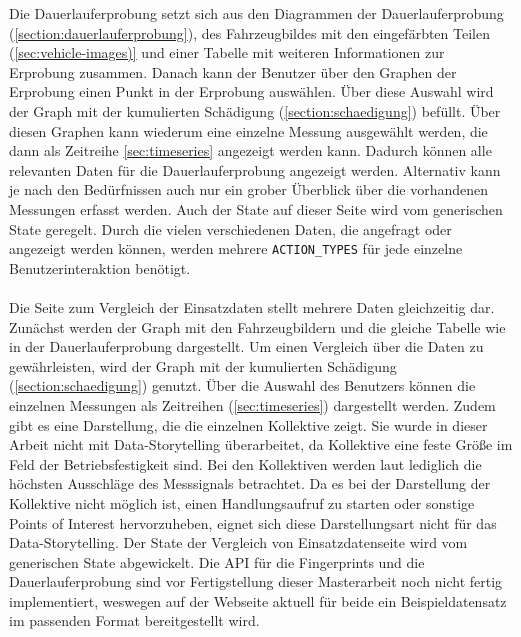Die Dauerlauferprobung setzt sich aus den Diagrammen der Dauerlauferprobung (\ref{section:dauerlauferprobung}), des Fahrzeugbildes mit den eingefärbten Teilen (\ref{sec:vehicle-images)} und einer Tabelle mit weiteren Informationen zur Erprobung zusammen. Danach kann der Benutzer über den Graphen der Erprobung einen Punkt in der Erprobung auswählen. Über diese Auswahl wird der Graph mit der kumulierten Schädigung (\ref{section:schaedigung}) befüllt. Über diesen Graphen kann wiederum eine einzelne Messung ausgewählt werden, die dann als Zeitreihe \ref{sec:timeseries} angezeigt werden kann. Dadurch können alle relevanten Daten für die Dauerlauferprobung angezeigt werden. Alternativ kann je nach den Bedürfnissen auch nur ein grober Überblick über die vorhandenen Messungen erfasst werden. Auch der State auf dieser Seite wird vom generischen State geregelt. Durch die vielen verschiedenen Daten, die angefragt oder angezeigt werden können, werden mehrere \texttt{ACTION\_TYPES} für jede einzelne Benutzerinteraktion benötigt.\\\\
Die Seite zum Vergleich der Einsatzdaten stellt mehrere Daten gleichzeitig dar. Zunächst werden der Graph mit den Fahrzeugbildern und die gleiche Tabelle wie in der Dauerlauferprobung dargestellt. Um einen Vergleich über die Daten zu gewährleisten, wird der Graph mit der kumulierten Schädigung (\ref{section:schaedigung}) genutzt. Über die Auswahl des Benutzers können die einzelnen Messungen als Zeitreihen (\ref{sec:timeseries}) dargestellt werden. Zudem gibt es eine Darstellung, die die einzelnen Kollektive zeigt. Sie wurde in dieser Arbeit nicht mit Data-Storytelling überarbeitet, da Kollektive eine feste Größe im Feld der Betriebsfestigkeit \cite{Gotz.2020} sind. Bei den Kollektiven werden laut \cite{PatrickPfeiffer.17.10.2022} lediglich die höchsten Ausschläge des Messsignals betrachtet. Da es bei der Darstellung der Kollektive nicht möglich ist, einen Handlungsaufruf zu starten oder sonstige Points of Interest hervorzuheben, eignet sich diese Darstellungsart nicht für das Data-Storytelling. Der State der Vergleich von Einsatzdatenseite wird vom generischen State abgewickelt. Die API für die Fingerprints und die Dauerlauferprobung sind vor Fertigstellung dieser Masterarbeit noch nicht fertig implementiert, weswegen auf der Webseite aktuell für beide ein Beispieldatensatz im passenden Format bereitgestellt wird.\\\\
